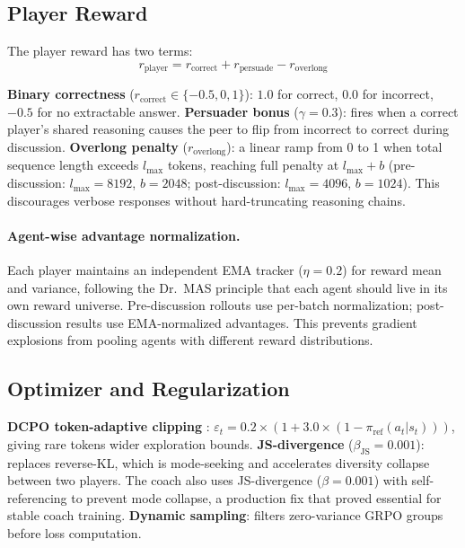 \documentclass{article}
\begin{document}
\subsection{Player Reward}
\label{sec:player_reward}

The player reward has two terms:
\begin{equation}
    r_{\text{player}} = r_{\text{correct}} + r_{\text{persuade}} - r_{\text{overlong}}
\end{equation}

\textbf{Binary correctness} ($r_{\text{correct}} \in \{-0.5, 0, 1\}$): $1.0$ for correct, $0.0$ for incorrect, $-0.5$ for no extractable answer. \textbf{Persuader bonus} ($\gamma = 0.3$): fires when a correct player's shared reasoning causes the peer to flip from incorrect to correct during discussion. \textbf{Overlong penalty} ($r_{\text{overlong}}$): a linear ramp from 0 to 1 when total sequence length exceeds $l_{\max}$ tokens, reaching full penalty at $l_{\max} + b$ (pre-discussion: $l_{\max}\!=\!8192$, $b\!=\!2048$; post-discussion: $l_{\max}\!=\!4096$, $b\!=\!1024$). This discourages verbose responses without hard-truncating reasoning chains.

\paragraph{Agent-wise advantage normalization.} Each player maintains an independent EMA tracker ($\eta = 0.2$) for reward mean and variance, following the Dr.~MAS principle that each agent should live in its own reward universe. Pre-discussion rollouts use per-batch normalization; post-discussion results use EMA-normalized advantages. This prevents gradient explosions from pooling agents with different reward distributions.


\subsection{Optimizer and Regularization}

\textbf{DCPO token-adaptive clipping} \citep{xu2025dcpo}: $\varepsilon_t = 0.2 \times (1 + 3.0 \times (1 - \pi_{\text{ref}}(a_t|s_t)))$, giving rare tokens wider exploration bounds. \textbf{JS-divergence} ($\beta_{\text{JS}} = 0.001$): replaces reverse-KL, which is mode-seeking and accelerates diversity collapse between two players. The coach also uses JS-divergence ($\beta = 0.001$) with self-referencing to prevent mode collapse, a production fix that proved essential for stable coach training. \textbf{Dynamic sampling}: filters zero-variance GRPO groups before loss computation.
\end{document}
